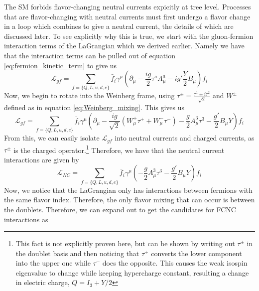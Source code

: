 The SM forbids flavor-changing neutral currents expicitly at tree level. Processes that are flavor-changing with neutral currents must first undergo a flavor change in a loop which combines to give a neutral current, the details of which are discussed later. To see explicitly why this is true, we start with the gluon-fermion interaction terms of the LaGrangian which we derived earlier. Namely we have that the interaction terms can be pulled out of equation \ref{eq:fermion_kinetic_term} to give us
\begin{equation}
\mathcal{L}_{gf} = \sum_{f=\{ Q, L, u, d, e\}} \bar{f}_{i} \gamma^\mu \left(\partial_\mu - \frac{ig}{2} \tau^a A^a_\mu - ig' \frac{Y}{2} B_\mu\right)f_{i}
\end{equation}
Now, we begin to rotate into the Weinberg frame, using $\tau^\pm = \frac{\tau^1 \pm i\tau^2}{\sqrt{2}}$ and $W^\pm$ defined as in equation \ref{eq:Weinberg_mixing}. This gives us
\begin{equation}
\mathcal{L}_{gf} = \sum_{f=\{ Q, L, u, d, e\}} \bar{f}_{i} \gamma^\mu \left(\partial_\mu - \frac{ig}{\sqrt{2}} (W^+_\mu\tau^+ + W_\mu^- \tau^-) -\frac{g}{2} A^3_\mu\tau^3 - \frac{g'}{2}B_\mu Y\right)f_{i}
\end{equation}
From this, we can easily isolate $\mathcal{L}_{gf}$ into neutral currents and charged currents, as $\tau^\pm$ is the charged operator.\footnote{This fact is not explicitly proven here, but can be shown by writing out $\tau^\pm$ in the doublet basis and then noticing that $\tau^+$ converts the lower component into the upper one while $\tau^-$ does the opposite. This causes the weak isospin eigenvalue to change while keeping hypercharge constant, resulting a change in electric charge, $Q = I_3 + Y/2$} Therefore, we have that the neutral current interactions are given by
\begin{equation}
\mathcal{L}_{NC} = \sum_{f=\{ Q, L, u, d, e\}} \bar{f}_{i} \gamma^\mu \left( -\frac{g}{2} A^3_\mu\tau^3 - \frac{g'}{2}B_\mu Y\right)f_{i}
\end{equation}
Now, we notice that the LaGrangian only has interactions between fermions with the same flavor index. Therefore, the only flavor mixing that can occur is between the doublets. Therefore, we can expand out to get the candidates for FCNC interactions as
